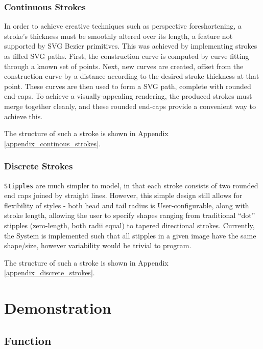 {\subsubsection{Continuous Strokes}

In order to achieve creative techniques such as perspective foreshortening, a stroke’s thickness must be smoothly altered over its length, a feature not supported by SVG Bezier primitives. 
This was achieved by implementing strokes as filled SVG paths.
First, the construction curve is computed by curve fitting through a known set of points.
Next, new curves are created, offset from the construction curve by a distance according to the desired stroke thickness at that point.
These curves are then used to form a SVG path, complete with rounded end-caps.
To achieve a visually-appealing rendering, the produced strokes must merge together cleanly, and these rounded end-caps provide a convenient way to achieve this.

The structure of such a stroke is shown in Appendix \ref{appendix_continous_strokes}.

\subsubsection{Discrete Strokes}

\texttt{Stipples} are much simpler to model, in that each stroke consists of two rounded end caps joined by straight lines.
However, this simple design still allows for flexibility of styles - both head and tail radius is User-configurable, along with stroke length, allowing the user to specify shapes ranging from traditional ``dot'' stipples (zero-length, both radii equal) to tapered directional strokes.
Currently, the System is implemented such that all stipples in a given image have the same shape/size, however variability would be trivial to program.

The structure of such a stroke is shown in Appendix \ref{appendix_discrete_strokes}.

\newpage
\section{Demonstration}

\subsection{Function}

}
